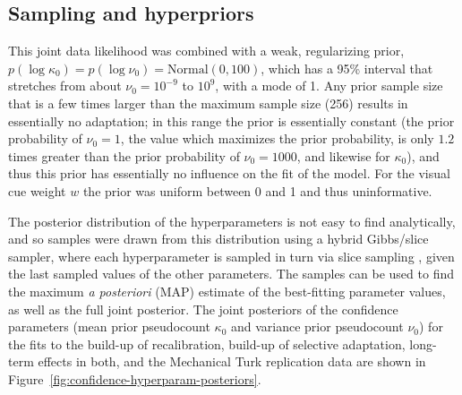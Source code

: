 \subsection{Sampling and hyperpriors}
\label{sec:sampl-hyperp-priors}

This joint data likelihood was combined with a weak, regularizing prior, $p(\log \kappa_0) = p(\log \nu_0) = \mathrm{Normal}(0, 100)$, which has a 95\% interval that stretches from about $\nu_0=10^{-9}$ to $10^{9}$, with a mode of 1.  Any prior sample size that is a few times larger than the maximum sample size (256) results in essentially no adaptation; in this range the prior is essentially constant (the prior probability of $\nu_0 = 1$, the value which maximizes the prior probability, is only $1.2$ times greater than the prior probability of $\nu_0=1000$, and likewise for $\kappa_0$), and thus this prior has essentially no influence on the fit of the model.  For the visual cue weight $w$ the prior was uniform between 0 and 1 and thus uninformative.

The posterior distribution of the hyperparameters is not easy to find analytically, and so samples were drawn from this distribution using a hybrid Gibbs/slice sampler, where each hyperparameter is sampled in turn via slice sampling \autocite{Neal2003}, given the last sampled values of the other parameters.  The samples can be used to find the maximum \emph{a posteriori} (MAP) estimate of the best-fitting parameter values, as well as the full joint posterior.  The joint posteriors of the confidence parameters (mean prior pseudocount $\kappa_0$ and variance prior pseudocount $\nu_0$) for the fits to the build-up of recalibration, build-up of selective adaptation, long-term effects in both, and the Mechanical Turk replication data are shown in Figure~\ref{fig:confidence-hyperparam-posteriors}.

